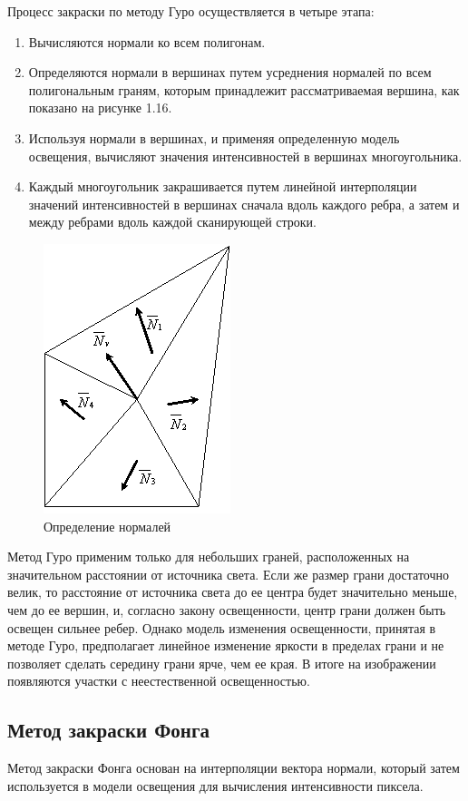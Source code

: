 \documentclass[12pt,a4paper,oneside]{report}
\begin{document}
	 Процесс закраски по методу Гуро осуществляется в четыре этапа:
	\begin{enumerate}
		\item Вычисляются нормали ко всем полигонам.
		\item Определяются нормали в вершинах путем усреднения нормалей по всем полигональным граням, которым принадлежит рассматриваемая вершина, как показано на рисунке 1.16.
		\item Используя нормали в вершинах, и применяя определенную модель освещения, вычисляют значения интенсивностей в вершинах многоугольника. 
		\item Каждый многоугольник закрашивается путем линейной интерполяции значений интенсивностей в вершинах сначала вдоль каждого ребра, а затем и между ребрами вдоль каждой сканирующей строки. 
	\end{enumerate}

	\begin{figure}[H]
		\centering
		\includegraphics[scale=0.7]{normals}
		\caption{Определение нормалей}
	\end{figure}

	 Метод Гуро применим только для небольших граней, расположенных на значительном расстоянии от источника света. Если же размер грани достаточно велик, то расстояние от источника света до ее центра будет значительно меньше, чем до ее вершин, и, согласно закону освещенности, центр грани должен быть освещен сильнее ребер. Однако модель изменения освещенности, принятая в методе Гуро, предполагает линейное изменение яркости в пределах грани и не позволяет сделать середину грани ярче, чем ее края. В итоге на изображении появляются участки с неестественной освещенностью.
	
	\subsection{Метод закраски Фонга}
	 \quad Метод закраски Фонга основан на интерполяции вектора нормали, который затем используется в модели освещения для вычисления интенсивности пиксела.  
	
\end{document}
